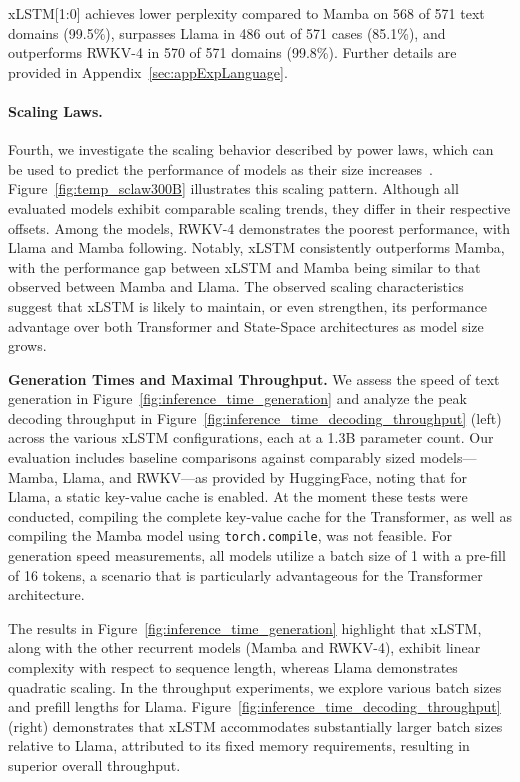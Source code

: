 xLSTM[1:0] achieves lower perplexity compared to Mamba on 568 of 571 text domains (99.5\%), surpasses Llama in 486 out of 571 cases (85.1\%), and outperforms RWKV-4 in 570 of 571 domains (99.8\%). Further details are provided in Appendix~\ref{sec:appExpLanguage}.

\paragraph{Scaling Laws.} Fourth, we investigate the scaling behavior described by power laws, which can be used to predict the performance of models as their size increases~\citep{Kaplan:20,Brown:20short}. Figure~\ref{fig:temp_sclaw300B} illustrates this scaling pattern. Although all evaluated models exhibit comparable scaling trends, they differ in their respective offsets. Among the models, RWKV-4 demonstrates the poorest performance, with Llama and Mamba following. Notably, xLSTM consistently outperforms Mamba, with the performance gap between xLSTM and Mamba being similar to that observed between Mamba and Llama. The observed scaling characteristics suggest that xLSTM is likely to maintain, or even strengthen, its performance advantage over both Transformer and State-Space architectures as model size grows.

\textbf{Generation Times and Maximal Throughput.} We assess the speed of text generation in Figure~\ref{fig:inference_time_generation} and analyze the peak decoding throughput in Figure~\ref{fig:inference_time_decoding_throughput} (left) across the various xLSTM configurations, each at a 1.3B parameter count. Our evaluation includes baseline comparisons against comparably sized models—Mamba, Llama, and RWKV—as provided by HuggingFace, noting that for Llama, a static key-value cache is enabled. At the moment these tests were conducted, compiling the complete key-value cache for the Transformer, as well as compiling the Mamba model using \texttt{torch.compile}, was not feasible. For generation speed measurements, all models utilize a batch size of 1 with a pre-fill of 16 tokens, a scenario that is particularly advantageous for the Transformer architecture.

The results in Figure~\ref{fig:inference_time_generation} highlight that xLSTM, along with the other recurrent models (Mamba and RWKV-4), exhibit linear complexity with respect to sequence length, whereas Llama demonstrates quadratic scaling. In the throughput experiments, we explore various batch sizes and prefill lengths for Llama. Figure~\ref{fig:inference_time_decoding_throughput} (right) demonstrates that xLSTM accommodates substantially larger batch sizes relative to Llama, attributed to its fixed memory requirements, resulting in superior overall throughput.

